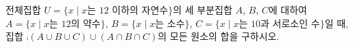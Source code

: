 전체집합 $U=\{x \mid x$는 $12$ 이하의 자연수$\}$의 세 부분집합 $A$, $B$, $C$에 대하여 $A=\{x \mid x$는 $12$의 약수$\}$, $B=\{x \mid x$는 소수$\}$, $C=\{x \mid x$는 $10$과 서로소인 수$\}$일 때, 집합 $\comp{(A\cup B\cup C)}\cup(A\cap B\cap C)$의 모든 원소의 합을 구하시오.
